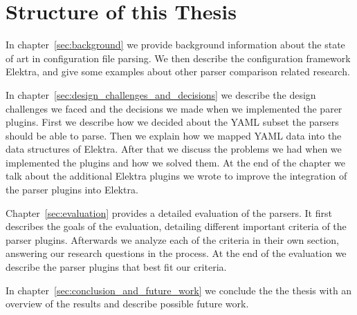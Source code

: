 \section{Structure of this Thesis}

In chapter~\ref{sec:background} we provide background information about the state of art in configuration file parsing. We then describe the configuration framework Elektra, and give some examples about other parser comparison related research.

In chapter~\ref{sec:design_challenges_and_decisions} we describe the design challenges we faced and the decisions we made when we implemented the parer plugins. First we describe how we decided about the YAML subset the parsers should be able to parse. Then we explain how we mapped YAML data into the data structures of Elektra. After that we discuss the problems we had when we implemented the plugins and how we solved them. At the end of the chapter we talk about the additional Elektra plugins we wrote to improve the integration of the parser plugins into Elektra.

Chapter~\ref{sec:evaluation} provides a detailed evaluation of the parsers. It first describes the goals of the evaluation, detailing different important criteria of the parser plugins. Afterwards we analyze each of the criteria in their own section, answering our research questions in the process. At the end of the evaluation we describe the parser plugins that best fit our criteria.

In chapter~\ref{sec:conclusion_and_future_work} we conclude the the thesis with an overview of the results and describe possible future work.
